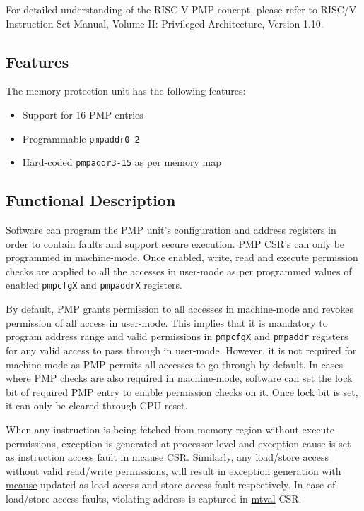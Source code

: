 \documentclass[main\_\_EN.tex]{subfiles}
\begin{document}
For detailed understanding of the RISC-V PMP concept, please refer to RISC\-/V Instruction Set Manual, Volume II: Privileged Architecture, Version 1.10.

\subsection{Features}
\label{sec:riscvcpu-pmp-features}
The memory protection unit has the following features:
\begin{itemize}
    \item {Support for 16 PMP entries}
    \item {Programmable \texttt{pmpaddr0-2}}
    \item {Hard-coded \texttt{pmpaddr3-15} as per \chipname{} memory map}
\end{itemize}

\subsection{Functional Description}
\label{sec:riscvcpu-pmp-func-descr}
Software can program the PMP unit's configuration and address registers in order to contain faults and support secure execution. PMP CSR's can only be programmed in machine-mode. Once enabled, write, read and execute permission checks are applied to all the accesses in user-mode as per programmed values of enabled \texttt{pmpcfgX} and \texttt{pmpaddrX} registers.

By default, PMP grants permission to all accesses in machine-mode and revokes permission of all access in user-mode. This implies that it is mandatory to program address range and valid permissions in \texttt{pmpcfgX} and \texttt{pmpaddr} registers for any valid access to pass through in user-mode. However, it is not required for machine-mode as PMP permits all accesses to go through by default. In cases where PMP checks are also required in machine-mode, software can set the lock bit of required PMP entry to enable permission checks on it. Once lock bit is set, it can only be cleared through CPU reset.

When any instruction is being fetched from memory region without execute permissions, exception is generated at processor level and exception cause is set as instruction access fault in \hyperref[regdesc:MCAUSE]{mcause} CSR. Similarly, any load/store access without valid read/write permissions, will result in exception generation with \hyperref[regdesc:MCAUSE]{mcause} updated as load access and store access fault respectively. In case of load/store access faults, violating address is captured in \hyperref[regdesc:MTVAL]{mtval} CSR.
\end{document}
